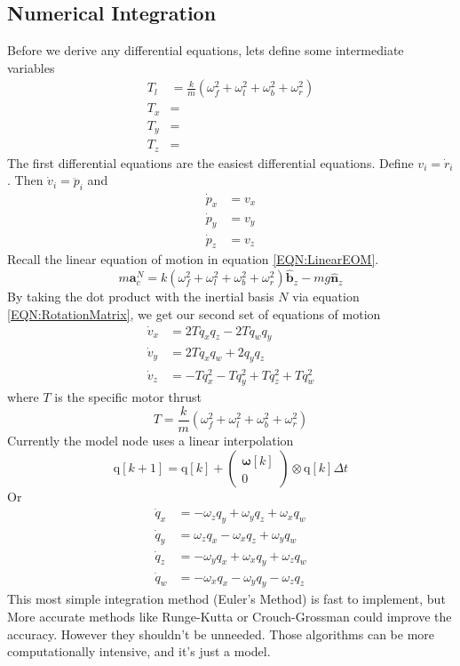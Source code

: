 \documentclass[lettersize,journal]{IEEEtran}
\begin{document}
\subsection{Numerical Integration}
Before we derive any differential equations, lets define some intermediate variables
\begin{align}
	T_l &= \frac{k}{m} \left(\omega_f^2 + \omega_l^2 + \omega_b^2 + \omega_r^2\right) \\
	T_x &= \\
	T_y &= \\
	T_z &=
\end{align}
The first differential equations are the easiest differential equations. Define $v_i = \dot{r}_i$. Then $\dot{v}_i=\ddot{p}_i$ and
\begin{align}
	\dot{p}_x &= v_x \\
	\dot{p}_y &= v_y \\
	\dot{p}_z &= v_z
\end{align}
Recall the linear equation of motion in equation \ref{EQN:LinearEOM}.
\begin{equation}
  m\mathbf{a}^N_c = k \left(\omega_f^2 + \omega_l^2 + \omega_b^2 + \omega_r^2\right) \mathbf{\hat{b}}_z - mg \mathbf{\hat{n}}_z \nonumber
\end{equation}
By taking the dot product with the inertial basis $N$ via equation \ref{EQN:RotationMatrix}, we get our second set of equations of motion
\begin{align}
	\dot{v}_x &= 2Tq_xq_z-2Tq_wq_y \\
	\dot{v}_y &= 2Tq_xq_w+2q_yq_z \\
	\dot{v}_z &= -Tq_x^2-Tq_y^2+Tq_z^2+Tq_w^2
\end{align}
where $T$ is the specific motor thrust
\begin{equation}
	T = \frac{k}{m}\left(\omega_f^2 + \omega_l^2 + \omega_b^2 + \omega_r^2\right)
\end{equation}
Currently the model node uses a linear interpolation
\begin{equation}
	\mathrm{q}[k+1] = \mathrm{q}[k] + 
		\begin{pmatrix}
		\boldsymbol\omega[k] \\
		0
	\end{pmatrix} \otimes
	\mathrm{q}[k] \Delta t
\end{equation}
Or 
\begin{align}
	\dot{q}_x &= -\omega_z q_y + \omega_y q_z + \omega_x q_w \\
  \dot{q}_y &= \omega_z q_x - \omega_x q_z + \omega_y q_w  \\
  \dot{q}_z &= -\omega_y q_x + \omega_x q_y + \omega_z q_w \\
  \dot{q}_w &=- \omega_x q_x - \omega_y q_y - \omega_z q_z
\end{align}
This most simple integration method (Euler's Method) is fast to implement, but More accurate methods like Runge-Kutta or Crouch-Grossman could improve the accuracy. However they shouldn't be unneeded. Those algorithms can be more computationally intensive, and it's just a model.
\end{document}
